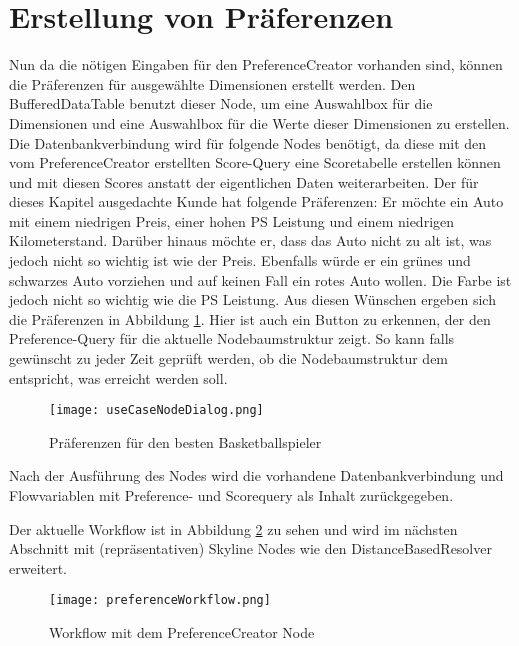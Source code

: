 \section{Erstellung von Präferenzen}
\label{ch:Evaluierung:sec:createPref}
Nun da die nötigen Eingaben für den PreferenceCreator vorhanden sind, können die Präferenzen für ausgewählte Dimensionen erstellt werden. Den BufferedDataTable benutzt dieser Node, um eine Auswahlbox für die Dimensionen und eine Auswahlbox für die Werte dieser Dimensionen zu erstellen. Die Datenbankverbindung wird für folgende Nodes benötigt, da diese mit den vom PreferenceCreator erstellten Score-Query eine Scoretabelle erstellen können und mit diesen Scores anstatt der eigentlichen Daten weiterarbeiten. 
Der für dieses Kapitel ausgedachte Kunde hat folgende Präferenzen: Er möchte ein Auto mit einem niedrigen Preis, einer hohen PS Leistung und einem niedrigen Kilometerstand. Darüber hinaus möchte er, dass das Auto nicht zu alt ist, was jedoch nicht so wichtig ist wie der Preis. Ebenfalls würde er ein grünes und schwarzes Auto vorziehen und auf keinen Fall ein rotes Auto wollen. Die Farbe ist jedoch nicht so wichtig wie die PS Leistung. Aus diesen Wünschen ergeben sich die Präferenzen in Abbildung \ref{img:useCaseNodeDialog}. Hier ist auch ein Button zu erkennen, der den Preference-Query für die aktuelle Nodebaumstruktur zeigt. So kann falls gewünscht zu jeder Zeit geprüft werden, ob die Nodebaumstruktur dem entspricht, was erreicht werden soll. 

\begin{figure}[H]
	\centering
	\texttt{[image: useCaseNodeDialog.png]}
	\caption{Präferenzen für den besten Basketballspieler}
	\label{img:useCaseNodeDialog}
\end{figure} 

Nach der Ausführung des Nodes wird die vorhandene Datenbankverbindung und Flowvariablen mit Preference- und Scorequery als Inhalt zurückgegeben. 

Der aktuelle Workflow ist in Abbildung \ref{img:preferenceWorkflow} zu sehen und wird im nächsten Abschnitt mit (repräsentativen) Skyline Nodes wie den DistanceBasedResolver erweitert. 

\begin{figure}[H]
	\centering
	\texttt{[image: preferenceWorkflow.png]}
	\caption{Workflow mit dem PreferenceCreator Node}
	\label{img:preferenceWorkflow}
\end{figure}  
